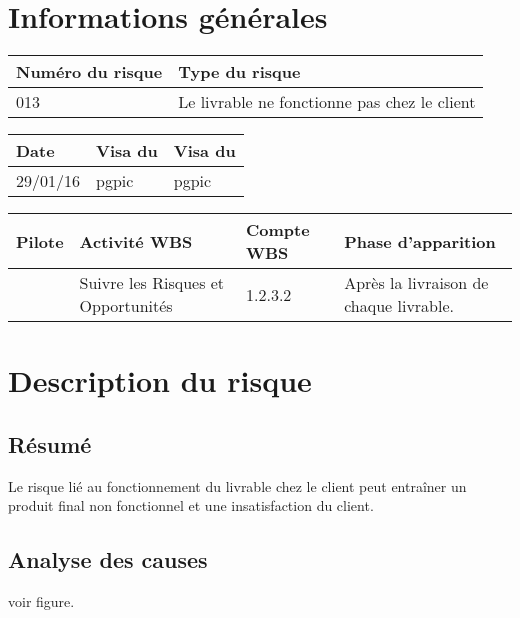 \section*{Informations générales}

\begin{table}[H]
\centering
	\begin{tabularx}{16.8cm}{|X|X|}
	\hline
	\rowcolor{gray!40} Numéro du risque & Type du risque \\
	\hline
	013 & Le livrable ne fonctionne pas chez le client \\
	\hline
	\end{tabularx}
\end{table}

\begin{table}[H]
\centering
	\begin{tabularx}{16.8cm}{|X|X|X|}
	\hline
	\rowcolor{gray!40} Date & Visa du \RQ & Visa du \CP \\
	\hline
	 29/01/16 & pgpic & pgpic \\
	\hline
	\end{tabularx}
\end{table}

\begin{table}[H]
\centering
	\begin{tabularx}{16.8cm}{|X|X|X|X|}
	\hline
	\rowcolor{gray!40} Pilote & Activité WBS & Compte WBS & Phase d'apparition \\
	\hline
	 \Michel & Suivre les Risques et Opportunités & 1.2.3.2 & Après la livraison de chaque livrable. \\
	\hline
	\end{tabularx}
\end{table}

\section*{Description du risque}

\subsection*{Résumé}
	Le risque lié au fonctionnement du livrable chez le client peut entraîner un produit final non fonctionnel et une insatisfaction du client.
	
\subsection*{Analyse des causes}
	voir figure.

